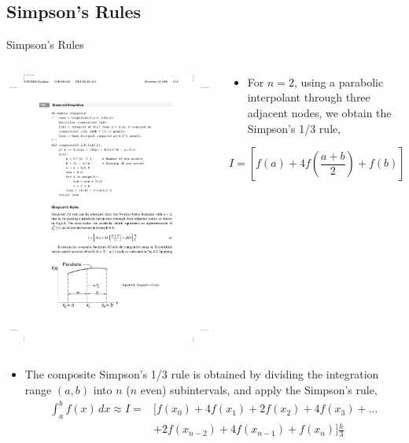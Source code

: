 \documentclass{beamer}
\newcommand{\beforeverb}{\footnotesize}
\newcommand{\afterverb}{\normalsize}
\begin{document}
\subsection[Simpson's Rules]{Simpson's Rules}
\begin{frame}{Simpson's Rules}
\begin{columns}
\begin{column}{0.4\textwidth}
\centerline{\includegraphics[width=\textwidth]{Lec12_Fig4}}
\end{column}
\begin{column}{0.7\textwidth}
\begin{itemize}
\item For $n=2$, using a parabolic interpolant through three adjacent nodes, we obtain the \alert{Simpson's 1/3 rule},
\end{itemize}
\beforeverb
\[
 I=\left[f(a)+4f\left(\frac{a+b}{2}\right)+f(b)\right]\frac{h}{3}
\]
\afterverb
\end{column}

\end{columns}
\begin{itemize}
\item The composite Simpson's 1/3 rule is obtained by dividing the integration range $(a, b)$ into $n$ ($n$ even) subintervals, and apply the Simpson's rule,
\begin{align*}
\int_a^b f(x) \, dx \approx I=&[f(x_0)+4f(x_1)+2f(x_2)+4f(x_3)+\ldots\\
&+2f(x_{n-2})+4f(x_{n-1})+f(x_n)]\frac{h}{3}
\end{align*}
\end{itemize}
\end{frame}
\end{document}

